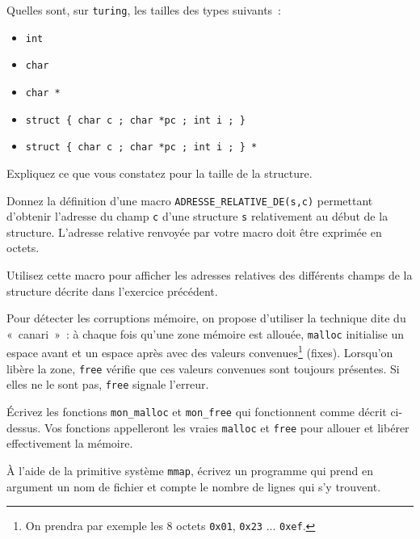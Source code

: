 %



\question

Quelles sont, sur \texttt {turing}, les tailles des types suivants~:
\begin {itemize}
    \item \texttt {int}
    \item \texttt {char}
    \item \texttt {char *}
    \item \verb|struct { char c ; char *pc ; int i ; }|
    \item \verb|struct { char c ; char *pc ; int i ; } *|
\end {itemize}

Expliquez ce que vous constatez pour la taille de la structure.


\question

Donnez la définition d'une macro \verb|ADRESSE_RELATIVE_DE(s,c)|
permettant d'obtenir l'adresse du champ \texttt {c} d'une structure
\texttt {s} relativement au début de la structure. L'adresse relative
renvoyée par votre macro doit être exprimée en octets.

Utilisez cette macro pour afficher les adresses relatives des différents
champs de la structure décrite dans l'exercice précédent.


\question

Pour détecter les corruptions mémoire, on propose d'utiliser la
technique dite du «~canari~»~: à chaque fois qu'une zone mémoire est
allouée, \texttt {malloc} initialise un espace avant et un espace après
avec des valeurs convenues\footnote {On prendra par exemple les 8 octets
\texttt {0x01}, \texttt {0x23} ... \texttt {0xef}.}
(fixes).  Lorsqu'on libère la zone, \texttt {free} vérifie que ces
valeurs convenues sont toujours présentes. Si elles ne le sont pas,
\texttt {free} signale l'erreur.

Écrivez les fonctions \texttt {mon\_malloc} et \texttt {mon\_free}
qui fonctionnent comme décrit ci-dessus. Vos fonctions appelleront
les vraies \texttt {malloc} et \texttt {free} pour allouer et libérer
effectivement la mémoire.


\question

À l'aide de la primitive système \texttt {mmap}, écrivez un programme
qui prend en argument un nom de fichier et compte le nombre de lignes
qui s'y trouvent.


